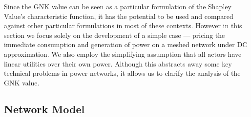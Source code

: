 Since the GNK value can be seen as a particular formulation of the Shapley Value's characteristic function, it has the potential to be used and compared against other particular formulations in most of these contexts.
However in this section we focus solely on the development of a simple case --- pricing the immediate consumption and generation of power on a meshed network under DC approximation.
We also employ the simplifying assumption that all actors have linear utilities over their own power.
Although this abstracts away some key technical problems in power networks, it allows us to clarify the analysis of the GNK value.


\subsection{Network Model}\label{sec:the_setup}

